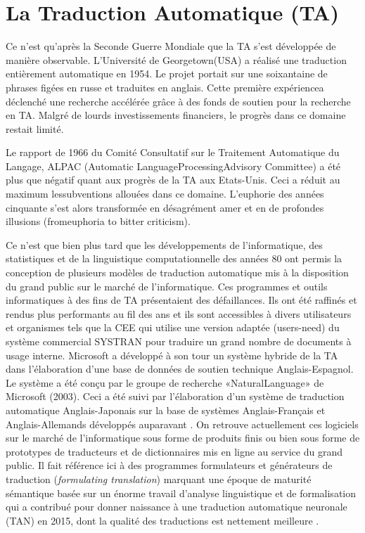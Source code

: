 \documentclass[french]{textolivre}
\begin{document}
\section{La Traduction Automatique (TA)}
Ce n’est qu’après la Seconde Guerre Mondiale que la TA s’est développée de manière observable. L’Université de Georgetown(USA) a réalisé une traduction entièrement automatique en 1954. Le projet portait sur une soixantaine de phrases figées en russe et traduites en anglais. Cette première expériencea déclenché une recherche accélérée grâce à des fonds de soutien pour la recherche en TA. Malgré de lourds investissements financiers, le progrès dans ce domaine restait limité.

Le rapport de 1966 du Comité Consultatif sur le Traitement Automatique du Langage, ALPAC (Automatic LanguageProcessingAdvisory Committee) a été plus que négatif quant aux progrès de la TA aux Etats-Unis. Ceci a réduit au maximum lessubventions allouées dans ce domaine. L’euphorie des années cinquante s’est alors transformée en désagrément amer et en de profondes illusions (fromeuphoria to bitter criticism).

Ce n’est que bien plus tard que les développements de l’informatique, des statistiques et de la linguistique computationnelle des années 80 ont permis la conception de plusieurs modèles de traduction automatique mis à la disposition du grand public sur le marché de l’informatique. Ces programmes et outils informatiques à des fins de TA présentaient des défaillances. Ils ont été raffinés et rendus plus performants au fil des ans et ils sont accessibles à divers utilisateurs et organismes tels que la CEE qui utilise une version adaptée (users-need) du système commercial SYSTRAN pour traduire un grand nombre de documents à usage interne. Microsoft a développé à son tour un système hybride de la TA dans l’élaboration d'une base de données de soutien technique Anglais-Espagnol. Le système a été conçu par le groupe de recherche «NaturalLanguage» de Microsoft (2003). Ceci a été suivi par l’élaboration d’un système de traduction automatique Anglais-Japonais sur la base de systèmes Anglais-Français et Anglais-Allemands développés auparavant \cite[p. 18]{ghenimi2007}. On retrouve actuellement ces logiciels sur le marché de l’informatique sous forme de produits finis ou bien sous forme de prototypes de traducteurs et de dictionnaires mis en ligne au service du grand public. Il fait référence ici à des programmes formulateurs et générateurs de traduction (\emph{formulating translation}) \cite{fulford2005} marquant une époque de maturité sémantique basée sur un énorme travail d’analyse linguistique et de formalisation \cite{anis1994} qui a contribué pour donner naissance à une traduction automatique neuronale (TAN) en 2015,  dont la qualité des traductions est nettement meilleure \cite{bedjaoui2020}.
   
\end{document}

